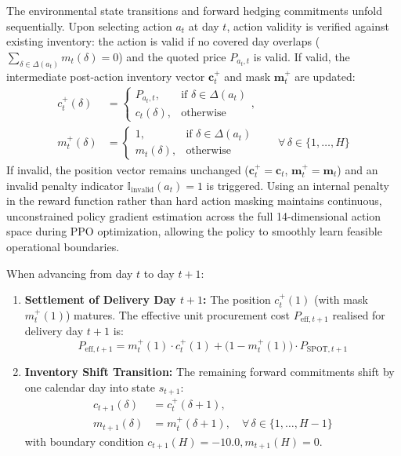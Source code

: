 The environmental state transitions and forward hedging commitments unfold sequentially. Upon selecting action $a_t$ at day $t$, action validity is verified against existing inventory: the action is valid if no covered day overlaps ($\sum_{\delta \in \Delta(a_t)} m_t(\delta) = 0$) and the quoted price $P_{a_t, t}$ is valid. If valid, the intermediate post-action inventory vector $\mathbf{c}_t^+$ and mask $\mathbf{m}_t^+$ are updated:
\begin{equation}
\begin{aligned}
    c_t^+(\delta) &= 
    \begin{cases}
        P_{a_t, t}, & \text{if } \delta \in \Delta(a_t) \\
        c_t(\delta), & \text{otherwise}
    \end{cases}, \\
    m_t^+(\delta) &= 
    \begin{cases}
        1, & \text{if } \delta \in \Delta(a_t) \\
        m_t(\delta), & \text{otherwise}
    \end{cases}
    \qquad \forall\,\delta \in \{1, \dots, H\}
\end{aligned}
\label{eq:inventory_update}
\end{equation}
If invalid, the position vector remains unchanged ($\mathbf{c}_t^+ = \mathbf{c}_t$, $\mathbf{m}_t^+ = \mathbf{m}_t$) and an invalid penalty indicator $\mathbb{I}_{\text{invalid}}(a_t) = 1$ is triggered. Using an internal penalty in the reward function rather than hard action masking maintains continuous, unconstrained policy gradient estimation across the full 14-dimensional action space during PPO optimization, allowing the policy to smoothly learn feasible operational boundaries.

When advancing from day $t$ to day $t+1$:
\begin{enumerate}
    \item \textbf{Settlement of Delivery Day $t+1$:} The position $c_t^+(1)$ (with mask $m_t^+(1)$) matures. The effective unit procurement cost $P_{\text{eff}, t+1}$ realised for delivery day $t+1$ is:
    \begin{equation}
        P_{\text{eff}, t+1} = m_t^+(1) \cdot c_t^+(1) + \big(1 - m_t^+(1)\big) \cdot P_{\text{SPOT}, t+1}
        \label{eq:effective_cost}
    \end{equation}
    \item \textbf{Inventory Shift Transition:} The remaining forward commitments shift by one calendar day into state $s_{t+1}$:
    \begin{equation}
    \begin{aligned}
        c_{t+1}(\delta) &= c_t^+(\delta + 1), \\
        m_{t+1}(\delta) &= m_t^+(\delta + 1), \quad \forall\,\delta \in \{1, \dots, H-1\}
    \end{aligned}
    \label{eq:inventory_shift}
    \end{equation}
    with boundary condition $c_{t+1}(H) = -10.0, m_{t+1}(H) = 0$.
\end{enumerate}

